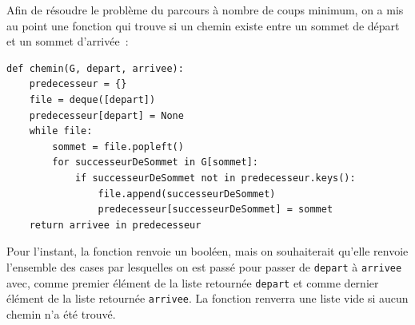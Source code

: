 %	





Afin de résoudre le problème du parcours à nombre de coups minimum, on a mis au point une fonction qui trouve si un chemin existe entre un sommet de départ et un sommet d'arrivée~: 
\begin{lstlisting}
def chemin(G, depart, arrivee):
    predecesseur = {}
    file = deque([depart])
    predecesseur[depart] = None
    while file:
        sommet = file.popleft()
        for successeurDeSommet in G[sommet]:
            if successeurDeSommet not in predecesseur.keys():
                file.append(successeurDeSommet)
                predecesseur[successeurDeSommet] = sommet
    return arrivee in predecesseur
\end{lstlisting}



Pour l'instant, la fonction renvoie un booléen, mais on souhaiterait qu'elle renvoie l'ensemble des cases par lesquelles on est passé pour passer de \texttt{depart} à \texttt{arrivee} avec, comme premier élément de la liste retournée \texttt{depart} et comme dernier élément de la liste retournée \texttt{arrivee}. La fonction renverra une liste vide si aucun chemin n'a été trouvé. 


